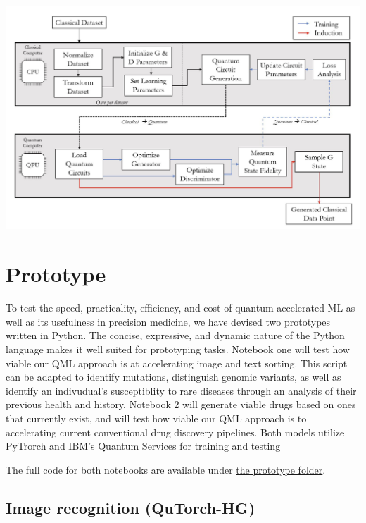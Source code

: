 \documentclass{scrartcl}
\begin{document}
\begin{center}
\includegraphics[width=.9\linewidth]{./assets/systemarchitecture.png}
\end{center}

\section{Prototype}
\label{sec:org028f6e9}

To test the speed, practicality, efficiency, and cost of quantum-accelerated ML as well as its usefulness in precision medicine, we have devised two prototypes written in Python. The concise, expressive, and dynamic nature of the Python language makes it well suited for prototyping tasks. Notebook one will test how viable our QML approach is at accelerating image and text sorting. This script can be adapted to identify mutations, distinguish genomic variants, as well as identify an indivudual's susceptiblity to rare diseases through an analysis of their previous health and history. Notebook 2 will generate viable drugs based on ones that currently exist, and will test how viable our QML approach is to accelerating current conventional drug discovery pipelines. Both models utilize PyTrorch and IBM's Quantum Services for training and testing

The full code for both notebooks are available under \href{prototype/}{the prototype folder}.

\subsection{Image recognition (QuTorch-HG)}
\label{sec:org40cc62b}
\end{document}
